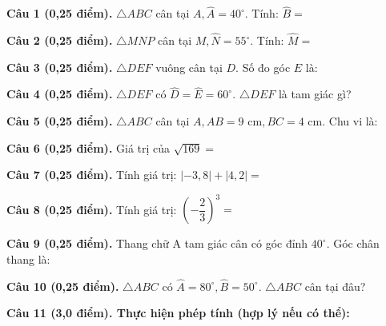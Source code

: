 \documentclass[12pt,a4paper]{article}
\begin{document}
\vspace{1.2mm}
\noindent\textbf{Câu 1 (0,25 điểm).} $\triangle ABC$ cân tại $A, \widehat{A} = 40^\circ$. Tính: $\widehat{B} =$ \par\vspace{2.5mm}
\noindent\textbf{Câu 2 (0,25 điểm).} $\triangle MNP$ cân tại $M, \widehat{N} = 55^\circ$. Tính: $\widehat{M} =$ \par\vspace{2.5mm}
\noindent\textbf{Câu 3 (0,25 điểm).} $\triangle DEF$ vuông cân tại $D$. Số đo góc $E$ là: \par\vspace{2.5mm}
\noindent\textbf{Câu 4 (0,25 điểm).} $\triangle DEF$ có $\widehat{D} = \widehat{E} = 60^\circ$. $\triangle DEF$ là tam giác gì? \par\vspace{2.5mm}
\noindent\textbf{Câu 5 (0,25 điểm).} $\triangle ABC$ cân tại $A, AB = 9\text{ cm}, BC = 4\text{ cm}$. Chu vi là: \par\vspace{2.5mm}
\noindent\textbf{Câu 6 (0,25 điểm).} Giá trị của $\sqrt{169} =$ \par\vspace{2.5mm}
\noindent\textbf{Câu 7 (0,25 điểm).} Tính giá trị: $|-3{,}8| + |4{,}2| =$ \par\vspace{2.5mm}
\noindent\textbf{Câu 8 (0,25 điểm).} Tính giá trị: $\left(-\dfrac{2}{3}\right)^3 =$ \par\vspace{2.5mm}
\noindent\textbf{Câu 9 (0,25 điểm).} Thang chữ A tam giác cân có góc đỉnh $40^\circ$. Góc chân thang là: \par\vspace{2.5mm}
\noindent\textbf{Câu 10 (0,25 điểm).} $\triangle ABC$ có $\widehat{A} = 80^\circ, \widehat{B} = 50^\circ$. $\triangle ABC$ cân tại đâu? \par\vspace{2.5mm}
\vspace{0.2mm}
\noindent\textbf{Câu 11 (3,0 điểm). Thực hiện phép tính (hợp lý nếu có thể):}
\vspace{0.5mm}
\end{document}
